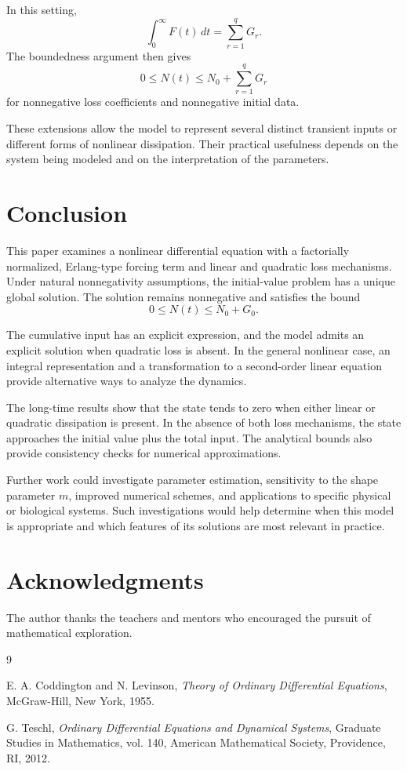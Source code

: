 \documentclass[12pt]{article}
\theoremstyle{definition}
\theoremstyle{remark}
\begin{document}
In this setting,
\[
\int_0^\infty F(t)\,dt=\sum_{r=1}^{q}G_r.
\]
The boundedness argument then gives
\[
0\leq N(t)\leq N_0+\sum_{r=1}^{q}G_r
\]
for nonnegative loss coefficients and nonnegative
initial data.

These extensions allow the model to represent several
distinct transient inputs or different forms of
nonlinear dissipation. Their practical usefulness
depends on the system being modeled and on the
interpretation of the parameters.

\section{Conclusion}

This paper examines a nonlinear differential equation
with a factorially normalized, Erlang-type forcing term
and linear and quadratic loss mechanisms. Under natural
nonnegativity assumptions, the initial-value problem
has a unique global solution. The solution remains
nonnegative and satisfies the bound
\[
0\leq N(t)\leq N_0+G_0.
\]

The cumulative input has an explicit expression, and
the model admits an explicit solution when quadratic
loss is absent. In the general nonlinear case, an
integral representation and a transformation to a
second-order linear equation provide alternative ways
to analyze the dynamics.

The long-time results show that the state tends to zero
when either linear or quadratic dissipation is present.
In the absence of both loss mechanisms, the state
approaches the initial value plus the total input.
The analytical bounds also provide consistency checks
for numerical approximations.

Further work could investigate parameter estimation,
sensitivity to the shape parameter \(m\), improved
numerical schemes, and applications to specific physical
or biological systems. Such investigations would help
determine when this model is appropriate and which
features of its solutions are most relevant in practice.

\section{Acknowledgments}

The author thanks the teachers and mentors who encouraged
the pursuit of mathematical exploration.

\begin{thebibliography}{9}

E. A. Coddington and N. Levinson,
\emph{Theory of Ordinary Differential Equations},
McGraw-Hill, New York, 1955.

G. Teschl,
\emph{Ordinary Differential Equations and Dynamical Systems},
Graduate Studies in Mathematics, vol. 140,
American Mathematical Society, Providence, RI, 2012.

\end{thebibliography}
\end{document}
